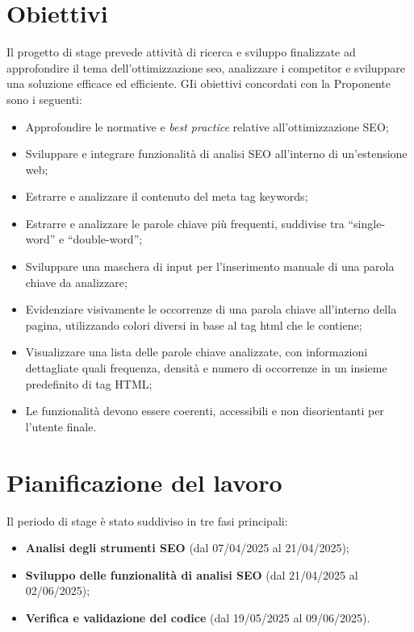 \section{Obiettivi}
\label{sec:obiettivi}

\par Il progetto di stage prevede attività di ricerca e sviluppo finalizzate ad approfondire il tema dell’ottimizzazione \gls{seo}, analizzare i competitor e sviluppare una soluzione efficace ed efficiente. GIi obiettivi concordati con la Proponente sono i seguenti:

\begin{itemize}
  \item Approfondire le normative e \textit{best practice} relative all’ottimizzazione SEO;
  \item Sviluppare e integrare funzionalità di analisi SEO all’interno di un’estensione web;
  \item Estrarre e analizzare il contenuto del meta tag keywords;
  \item Estrarre e analizzare le parole chiave più frequenti, suddivise tra “single-word” e “double-word”;
  \item Sviluppare una maschera di input per l’inserimento manuale di una parola chiave da analizzare;
  \item Evidenziare visivamente le occorrenze di una parola chiave all’interno della pagina, utilizzando colori diversi in base al tag \gls{html} che le contiene;
  \item Visualizzare una lista delle parole chiave analizzate, con informazioni dettagliate quali frequenza, densità e numero di occorrenze in un insieme predefinito di tag HTML;
  \item Le funzionalità devono essere coerenti, accessibili e non disorientanti per l’utente finale.
\end{itemize}

\section{Pianificazione del lavoro}
\label{sec:pianificazione}

\par Il periodo di stage è stato suddiviso in tre fasi principali:
\begin{itemize}
  \item \textbf{Analisi degli strumenti SEO} (dal 07/04/2025 al 21/04/2025);
  \item \textbf{Sviluppo delle funzionalità di analisi SEO} (dal 21/04/2025 al 02/06/2025);
  \item \textbf{Verifica e validazione del codice} (dal 19/05/2025 al 09/06/2025).
\end{itemize}

